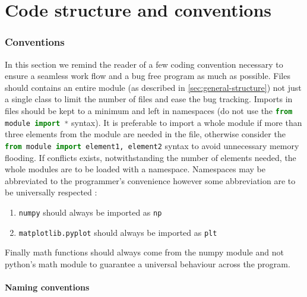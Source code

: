 \documentclass[]{article}
\begin{document}
\newpage
\part{Code structure and conventions}\label{sec:code-structure-and-conventions}

\section{Conventions}\label{sec:conventions}

In this section we remind the reader of a few coding convention necessary to ensure a seamless work flow and a bug free program as much as possible.
Files should contains an entire module (as described in \ref{sec:general-structure}) not just a single class to limit the number of files and ease the bug tracking.
Imports in files should be kept to a minimum and left in namespaces (do not use the \lstinline[columns=fixed,language=Python]|from module import *| syntax). It is preferable to import a whole module if more than three elements from the module are needed in the file, otherwise consider the \lstinline[columns=fixed,language=Python]|from module import element1, element2| syntax to avoid unnecessary memory flooding. If conflicts exists, notwithstanding the number of elements needed, the whole modules are to be loaded with a namespace.
Namespaces may be abbreviated to the programmer's convenience however some abbreviation are to be universally respected :
\begin{enumerate}[label=(\roman*)]
	\item \texttt{numpy} should always be imported as \texttt{np}
	\item \texttt{matplotlib.pyplot} should always be imported as \texttt{plt}
\end{enumerate}

Finally math functions should always come from the numpy module and not python's math module to guarantee a universal behaviour across the program.

\subsection{Naming conventions}\label{sec:naming-conventions}
\end{document}
